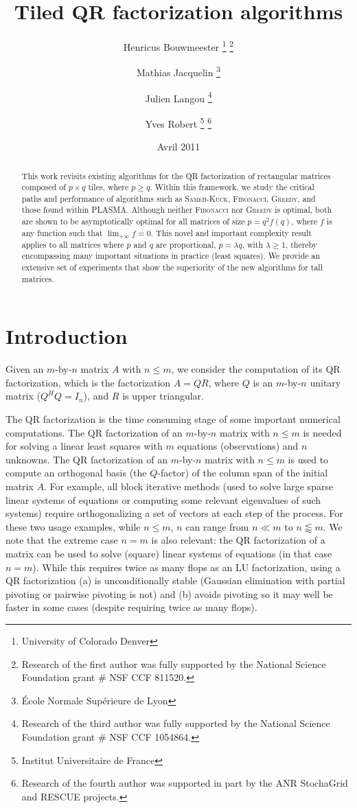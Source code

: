\documentclass[a4paper,twopages]{article}
\date{Avril 2011}
\author{
  Henricus Bouwmeester
\thanks{University of Colorado Denver}
\thanks{Research of the first author was fully supported by the National Science Foundation grant \# NSF CCF 811520.}
  \and
  Mathias Jacquelin
\thanks{\'Ecole Normale Sup\'erieure de Lyon}
  \and
  Julien Langou
\footnotemark[1]
\thanks{Research of the third author was fully supported by the National Science Foundation grant \# NSF CCF 1054864.}
  \and
  Yves Robert
\footnotemark[3]
\thanks{Institut Universitaire de France}
\thanks{Research of the fourth author was supported in part by the ANR StochaGrid and RESCUE projects.}
}
\title{Tiled QR factorization algorithms}
\newcommand{\SK}{\textsc{Sameh-Kuck}\xspace}
\newcommand{\MC}{\textsc{Fibonacci}\xspace}
\newcommand{\Greedy}{\textsc{Greedy}\xspace}
\begin{document}
\maketitle
\begin{abstract}
        This work revisits existing algorithms for the QR factorization of
    rectangular matrices composed of $p \times q$ tiles, where $p \geq q$.
    Within this framework, we study the critical paths and performance of
    algorithms such as \SK, \MC, \Greedy, and those found within PLASMA.
    Although neither \MC nor \Greedy is optimal, both are shown to
    be asymptotically optimal for all matrices of size $p = q^2 f(q)$, where
    $f$ is any function such that $\lim_{+\infty} f= 0$. This novel and important complexity
    result applies to
    all matrices where $p$ and $q$ are proportional, $ p = \lambda q$, with
    $\lambda \geq 1$, thereby encompassing many important situations in
    practice (least squares). We provide an extensive set of experiments that
    show the superiority of the new algorithms for
    tall matrices.
\end{abstract}


\section{Introduction}
\label{sec.intro}

Given an $m$-by-$n$ matrix $A$ with $n \leq m$, we consider the computation of
its QR factorization, which is the factorization $A = QR$, where $Q$ is an
$m$-by-$n$ unitary matrix ($Q^HQ = I_n$), and $R$ is upper triangular.

The QR factorization is the time consuming stage of some important numerical
computations.  The QR factorization of an $m$-by-$n$ matrix with $n \leq m$ is
needed for solving a linear least squares with $m$ equations (observations) and $n$ unknowns.  The QR factorization of an $m$-by-$n$ matrix
with $n \leq m$ is used to compute an orthogonal basis (the $Q$-factor) of the
column span of the initial matrix $A$.  For example, all block iterative
methods (used to solve large sparse linear systems of equations or computing
some relevant eigenvalues of such systems) require orthogonalizing a set of
vectors at each step of the process. For these two usage examples, while
$n\leq m$, $n$ can range from $n \ll m$ to $ n \lessapprox m$. We note that the
extreme case $n=m$ is also relevant:  the QR factorization of a matrix can be
used to solve (square) linear systems of equations (in that case $n=m$). While
this requires twice as many flops as an LU factorization, using a QR
factorization (a) is unconditionally stable (Gaussian elimination with partial
pivoting or pairwise pivoting is not) and (b) avoids pivoting so it may well be
faster in some cases (despite requiring twice as many flops).
\end{document}
